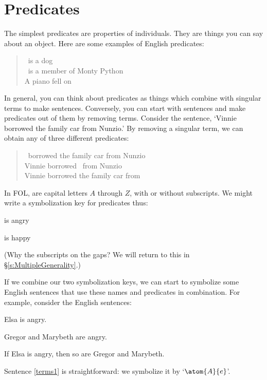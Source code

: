 \section{Predicates}
The simplest predicates are properties of individuals. They are things you can say about an object. Here are some examples of English predicates:
	\begin{quote}
		\blank\ is a dog\\
		\blank\ is a member of Monty Python\\
		A piano fell on \blank
	\end{quote}
In general, you can think about predicates as things which combine with singular terms to make sentences. Conversely, you can start with sentences and make predicates out of them by removing terms. Consider the sentence, `Vinnie borrowed the family car from Nunzio.' By removing a singular term, we can obtain any of three different predicates:
	\begin{quote}
		\blank\ borrowed the family car from Nunzio\\
		Vinnie borrowed \blank\ from Nunzio\\
		Vinnie borrowed the family car from \blank
	\end{quote}
In FOL,  are capital letters $A$ through $Z$, with or without subscripts. We might write a symbolization key for predicates thus:
	\begin{ekey}
		\item[\atom{A}{x}]  is angry
		\item[\atom{H}{x}]  is happy
	\end{ekey}
        (Why the subscripts on the gaps? We will return to this in \S\ref{s:MultipleGenerality}.)


If we combine our two symbolization keys, we can start to symbolize some English sentences that use these names and predicates in combination. For example, consider the English sentences:
	\begin{earg}
		\item[\ex{terms1}] Elsa is angry.
		\item[\ex{terms2a}] Gregor and Marybeth are angry.
		\item[\ex{terms2}] If Elsa is angry, then so are Gregor and Marybeth.
	\end{earg}
Sentence \ref{terms1} is straightforward: we symbolize it by `$\atom{A}{e}$'.

